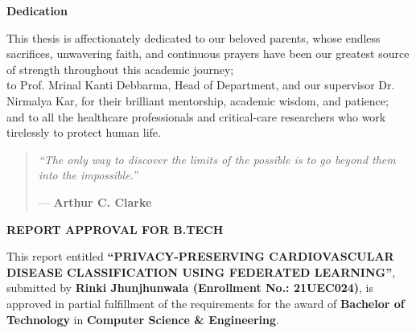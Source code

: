 \documentclass[12pt,a4paper,oneside]{report}
\newenvironment{dedication}
{
  \cleardoublepage
  \thispagestyle{plain}
  \begin{center}
    \vspace*{2.5in}
    {\Large\bfseries Dedication}\par
    \vspace{0.3in}
  \end{center}
  \begin{itshape}
  \centering
}
{
  \end{itshape}
  \vfill
}
\newenvironment{thesisquote}
{
  \cleardoublepage
  \thispagestyle{plain}
  \vspace*{2.8in}
  \begin{center}
  \begin{itshape}\large
}
{
  \end{itshape}
  \end{center}
  \vfill
}
\begin{document}
\setcounter{page}{3}

\begin{dedication}
    This thesis is affectionately dedicated to our beloved parents, whose endless sacrifices, unwavering faith, and continuous prayers have been our greatest source of strength throughout this academic journey;\\
    \vspace{0.8cm}
    to Prof. Mrinal Kanti Debbarma, Head of Department, and our supervisor Dr. Nirmalya Kar, for their brilliant mentorship, academic wisdom, and patience;\\
    \vspace{0.8cm}
    and to all the healthcare professionals and critical-care researchers who work tirelessly to protect human life.
\end{dedication}

\begin{thesisquote}
    \vspace*{1.5in}
    \begin{quote}
        \centering
        \Large \itshape
        ``The only way to discover the limits of the possible is to go beyond them into the impossible.''
        
        \vspace{0.5cm}
        \normalfont \large --- \textbf{Arthur C. Clarke}
    \end{quote}
\end{thesisquote}

\cleardoublepage
\thispagestyle{plain}
\begin{center}
    \vspace*{0.5in}
    {\Large \textbf{REPORT APPROVAL FOR B.TECH}\par}
    \vspace{1.0in}
\end{center}

\noindent This report entitled \textbf{``PRIVACY-PRESERVING CARDIOVASCULAR DISEASE CLASSIFICATION USING FEDERATED LEARNING''}, submitted by \textbf{Rinki Jhunjhunwala (Enrollment No.: 21UEC024)}, is approved in partial fulfillment of the requirements for the award of \textbf{Bachelor of Technology} in \textbf{Computer Science \& Engineering}.
\end{document}
